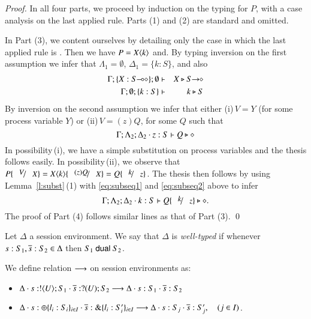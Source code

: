\begin{proof}
	In all four parts, we proceed by induction on the typing for $P$,
	with a case analysis on the last applied rule. 
	Parts (1) and (2) are standard and omitted. 

	In Part (3), we content ourselves by detailing only the case in
	which the last applied rule is . 
	Then we have $P = X\langle k \rangle$ and. By typing inversion on the first assumption we infer that
	$\Lambda_1 = \emptyset$, $\Delta_1 = \{k : S\}$, and also
%
	\begin{eqnarray}
		\Gamma; \{X : \lhot{S} \} ; \emptyset & \proves &  X \hastype \shot{S} \nonumber \\
		\Gamma; \emptyset; \{k : S\} & \proves & k \hastype S  \label{eq:subseq1}
	\end{eqnarray}
%
	By inversion on the second assumption we infer that either
	(i)\,$V = Y$ (for some process variable $Y$) or 
	(ii)\,$V = (z)Q$, for some $Q$ such that
%
	\begin{equation}
		\Gamma; \Lambda_2 ; \Delta_2 \cdot z:S  \vdash Q \triangleright \diamond \label{eq:subseq2}\\
	\end{equation}
%
	In possibility\,(i), we have a simple substitution on process variables and the thesis follows easily. 
	In possibility\,(ii), we observe that $P\subst{V}{X} = \appl{X}{k}\subst{(z)Q}{X} = Q\subst{k}{z}$.
	The thesis then follows by using Lemma~\ref{l:subst}\,(1) with \eqref{eq:subseq1} and \eqref{eq:subseq2} above to infer 
%
	\begin{equation*}
		\Gamma; \Lambda_2 ; \Delta_2 \cat k:S  \proves Q \subst{k}{z} \hastype \Proc .
	\end{equation*}
%
	The proof of Part (4) follows similar lines as that of Part (3).
	\qed
\end{proof}

\begin{definition}\rm
	Let $\Delta$ a session environment.
	We say that $\Delta$ is {\em well-typed} if whenever
	$s: S_1, \overline{s}: S_2 \in \Delta$ then $S_1 \ \mathsf{dual}\  S_2$.
\end{definition}

\begin{definition}\rm
	We define relation $\longrightarrow$ on session environments as:
	\begin{itemize}
		\item	$\Delta \cdot s: ! \langle U \rangle ; S_1 \cdot \overline{s}: ? (U) ; S_2 \longrightarrow \Delta \cdot s: S_1 \cdot \overline{s}: S_2$
		\item	$\Delta \cdot s: \oplus \{l_i: S_i\}_{i \in I} \cdot \overline{s}: \& \{l_i: S_i'\}_{i \in I} \longrightarrow \Delta \cdot s: S_j \cdot \overline{s}: S_j', \quad (j \in I)$.
	\end{itemize}
\end{definition}

